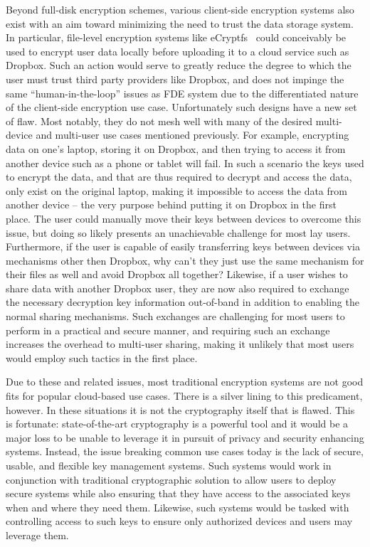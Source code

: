 Beyond full-disk encryption schemes, various client-side encryption
systems also exist with an aim toward minimizing the need to trust the
data storage system. In particular, file-level encryption systems like
eCryptfs~\cite{ecryptfs} could conceivably be used to encrypt user
data locally before uploading it to a cloud service such as
Dropbox. Such an action would serve to greatly reduce the degree to
which the user must trust third party providers like Dropbox, and does
not impinge the same ``human-in-the-loop'' issues as FDE system due to
the differentiated nature of the client-side encryption use
case. Unfortunately such designs have a new set of flaw. Most notably,
they do not mesh well with many of the desired multi-device and
multi-user use cases mentioned previously. For example, encrypting
data on one's laptop, storing it on Dropbox, and then trying to access
it from another device such as a phone or tablet will fail. In such a
scenario the keys used to encrypt the data, and that are thus required
to decrypt and access the data, only exist on the original laptop,
making it impossible to access the data from another device -- the
very purpose behind putting it on Dropbox in the first place. The user
could manually move their keys between devices to overcome this issue,
but doing so likely presents an unachievable challenge for most lay
users. Furthermore, if the user is capable of easily transferring keys
between devices via mechanisms other then Dropbox, why can't they just
use the same mechanism for their files as well and avoid Dropbox all
together? Likewise, if a user wishes to share data with another
Dropbox user, they are now also required to exchange the necessary
decryption key information out-of-band in addition to enabling the
normal sharing mechanisms. Such exchanges are challenging for most
users to perform in a practical and secure manner, and requiring such
an exchange increases the overhead to multi-user sharing, making it
unlikely that most users would employ such tactics in the first place.

Due to these and related issues, most traditional encryption systems
are not good fits for popular cloud-based use cases. There is a silver
lining to this predicament, however. In these situations it is not the
cryptography itself that is flawed. This is fortunate:
state-of-the-art cryptography is a powerful tool and it would be a
major loss to be unable to leverage it in pursuit of privacy and
security enhancing systems. Instead, the issue breaking common use
cases today is the lack of secure, usable, and flexible key management
systems. Such systems would work in conjunction with traditional
cryptographic solution to allow users to deploy secure systems while
also ensuring that they have access to the associated keys when and
where they need them. Likewise, such systems would be tasked with
controlling access to such keys to ensure only authorized devices and
users may leverage them.

